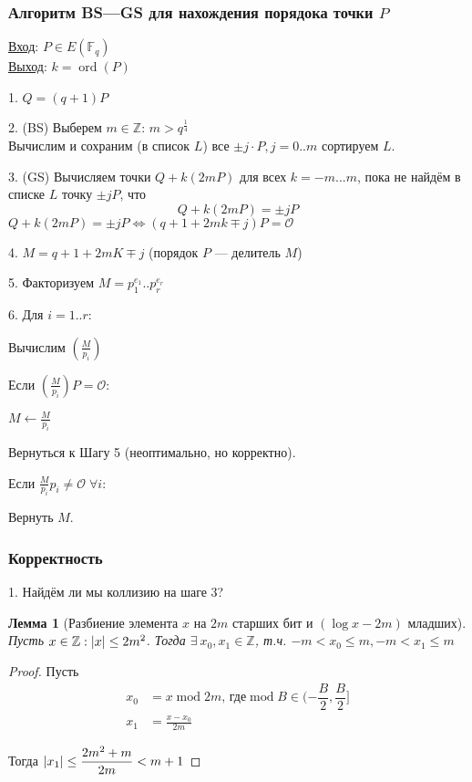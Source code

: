 \documentclass[12pt]{article}
\newcommand{\Z}{{{\mathbb Z}}}
\newcommand{\F}{{{\mathbb F}}}
\newcommand{\bigO}{\mathcal{O}}
\DeclarePairedDelimiter{\abs}{\lvert}{\rvert}
\newtheorem{lemma}[theorem]{Лемма}
\theoremstyle{definition}
\theoremstyle{definition}
\theoremstyle{definition}
\begin{document}
\subsubsection{Алгоритм BS—GS для нахождения порядока точки $P$}

\underline{Вход}: $P\in E(\F_q)$\\
\underline{Выход}: $k = \operatorname{ord}(P)$

1. $Q = (q+1)P$

2. (BS) Выберем $m \in \Z$: $m > q^\frac{1}{4}$\\
Вычислим и сохраним (в список $L$) все $\pm j \cdot P, j = 0..m$ сортируем $L$.

3. (GS) Вычисляем точки $Q + k(2mP)$ для всех $k = -m ... m$, пока не найдём в списке $L$ точку $\pm  jP$, что 
\[
    Q + k(2mP) = \pm  jP
\]
$Q + k(2mP) = \pm jP \iff (q+1 + 2mk \mp  j)P = \bigO$

4. $M = q+1+2mK \mp  j$ (порядок $P$ — делитель $M$)

5. Факторизуем $M = p_1^{e_1}..p_r^{e_r}$

6. Для $i = 1..r$:

Вычислим $\left(\frac{M}{p_i} \right)$

Если $\left(\frac{M}{p_i} \right)P=\bigO$:

\quad $M \leftarrow \frac{M}{p_i}$

\quad Вернуться к Шагу 5 (неоптимально, но корректно). 

Если $\frac{M}{p_i}p_i \neq \bigO \; \forall i$:

\quad Вернуть $M$.

\subsubsection{Корректность}

1. Найдём ли мы коллизию на шаге 3?
\begin{lemma}[Разбиение элемента $x$ на $2m$ старших бит и $(\log x - 2m)$ младших]
    Пусть $x \in \Z: \abs{x} \leq 2m^2$. Тогда $\exists \ x_0, x_1 \in \Z$, т.ч. $-m < x_0 \leq m, -m < x_1 \leq m$
\end{lemma}
\begin{proof}
    Пусть
    \begin{align*}
        x_0 &= x \operatorname{mod} 2m \text{, где} \operatorname{mod} B \in (-\dfrac{B}{2}, \dfrac{B}{2}] \\
        x_1 &= \frac{x-x_0}{2m}
    \end{align*}
    
    Тогда $\abs{x_1} \leq \dfrac{2m^2 + m}{2m} < m+1$
\end{proof}
\end{document}
